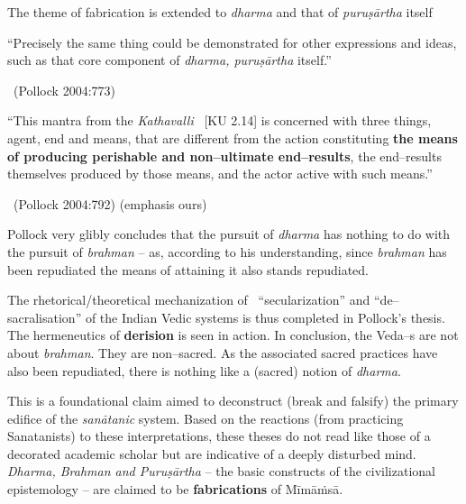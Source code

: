 \medskip

The theme of fabrication is extended to \textit{dharma} and that of \textit{puruṣārtha} itself

\medskip

\begin{myquote}
“Precisely the same thing could be demonstrated for other expressions and ideas, such as that core component of \textit{dharma, puruṣārtha} itself.”

~\hfill (Pollock 2004:773)
\end{myquote}

\begin{myquote}
“This mantra from the \textit{Kathavalli}  [KU 2.14] is concerned with three things, agent, end and means, that are different from the action constituting \textbf{the means of producing perishable and non–ultimate end–results}, the end–results themselves produced by those means, and the actor active with such means.”

~\hfill (Pollock 2004:792) (emphasis ours)
\end{myquote}

Pollock very glibly concludes that the pursuit of \textit{dharma} has nothing to do with the pursuit of \textit{brahman} – as, according to his understanding, since \textit{brahman} has been repudiated the means of attaining it also stands repudiated.

The rhetorical/theoretical mechanization of  “secularization” and “de–sacralisation” of the Indian Vedic systems is thus completed in Pollock’s thesis. The hermeneutics of \textbf{derision} is seen in action. In conclusion, the Veda–s are not about \textit{brahman}. They are non–sacred. As the associated sacred practices have also been repudiated, there is nothing like a (sacred) notion of \textit{dharma}.

This is a foundational claim aimed to deconstruct (break and falsify) the primary edifice of the \textit{sanātanic} system. Based on the reactions (from practicing Sanatanists) to these interpretations, these theses do not read like those of a decorated academic scholar but are indicative of a deeply disturbed mind. \textit{Dharma, Brahman and Puruṣārtha} – the basic constructs of the civilizational epistemology – are claimed to be \textbf{fabrications} of Mīmāṁsā.


